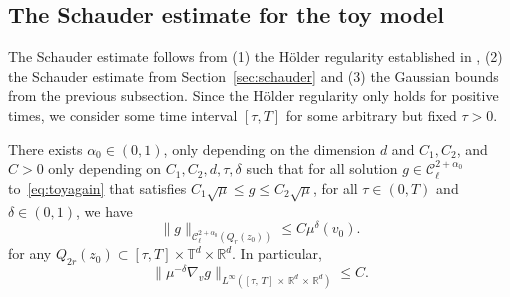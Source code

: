 \documentclass[AHL,Unicode,longabstracts,published]{cedram}
\newcommand{\R}{\mathbb{R}}
\newcommand{\T}{\mathbb{T}}
\newcommand{\cC}{\mathcal{C}}
\begin{document}
\subsection{The Schauder estimate for the toy model}\label{sec:scha-estim-toy}

The Schauder estimate follows from (1) the H\"older regularity established in \cite{gimv, wz09}, (2) the Schauder estimate from Section~\ref{sec:schauder} and (3) the Gaussian bounds from the previous subsection. Since the H\"older regularity only holds for positive times, we consider some time interval $[\tau,T]$ for some arbitrary but fixed $\tau>0$.

\begin{prop}\label{prop:local}
There exists ${\alpha_0} \in (0,1)$, only depending on the dimension $d$ and $C_1,C_2$, and $C>0$ only depending on $C_1,C_2,d, \tau,\delta$ such that for all solution $g \in \cC_\ell^{2+{\alpha_0}}$ to~\eqref{eq:toyagain} that satisfies $C_1 \sqrt \mu \le g \le C_2 \sqrt \mu$, for all $\tau \in (0,T)$ and $\delta \in (0,1)$, we have
\begin{equation}\label{eq:decay}
\| g \|_{\cC_\ell^{2+{\alpha_0}}\left(Q_r(z_0)\right)} \le C \mu^\delta (v_0).
\end{equation}
for any $Q_{2r} (z_0) \subset [\tau, T] \times \T^d \times \R^d$. In particular,
\begin{equation}\label{e:decay-grad}
\| \mu^{-\delta} \nabla_v g \|_{L^\infty\left([\tau,\,T] \,\times\,\R^d\,\times\,\R^d\right)} \le C.
\end{equation}
\end{prop}
\end{document}
